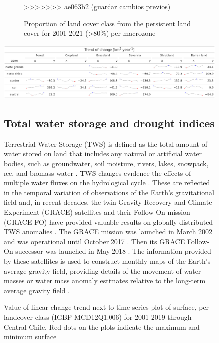 \documentclass[
  number,
  preprint,
  3p]{elsarticle}
\begin{document}
\begin{figure}[!ht]
\begin{figure}
{}

\caption{Proportion of land cover class from the persistent land cover
for 2001-2021 (\textgreater80\%) per macrozone}
>>>>>>> ae063b2 (guardar cambios previos)

\end{figure}

\begin{table}[!ht]
\caption{Value of linear change trend next to time-series plot of surface, per landcover class (IGBP MCD12Q1.006) for 2001-2019 through Central Chile. Red dots on the plots indicate the maximum and minimum surface}
\includegraphics[]{../output/figs/table_var_landcover_macro.png}
\end{table}

\hypertarget{total-water-storage-and-drought-indices}{%
\subsection{Total water storage and drought
indices}\label{total-water-storage-and-drought-indices}}

Terrestrial Water Storage (TWS) is defined as the total amount of water
stored on land that includes any natural or artificial water bodies,
such as groundwater, soil moisture, rivers, lakes, snowpack, ice, and
biomass water \citep{Humphrey2023, Deng2023}. TWS changes evidence the
effects of multiple water fluxes on the hydrological cycle
\citep{Deng2023}. These are reflected in the temporal variation of
observations of the Earth's gravitational field
\citep{Abolafia2021, Sabzehee2023} and, in recent decades, the twin
Gravity Recovery and Climate Experiment (GRACE) satellites and their
Follow-On mission (GRACE-FO) have provided valuable results on globally
distributed TWS anomalies \citep{Tapley2019, Ferreira2023}. The GRACE
mission was launched in March 2002 and was operational until October
2017 \citep{Ramjeawon2022}. Then its GRACE Follow-On successor was
launched in May 2018 \citep{Landerer2020, Yin2022}. The information
provided by these satellites is used to construct monthly maps of the
Earth's average gravity field, providing details of the movement of
water masses or water mass anomaly estimates relative to the long-term
average gravity field \citep{Humphrey2023, Wahr2004}.


\end{figure}
\end{document}
